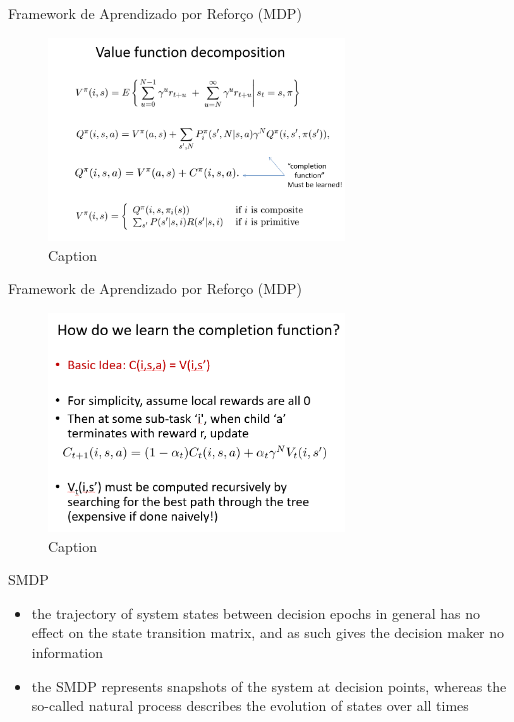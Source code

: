 \begin{frame}{Framework de Aprendizado por Reforço (MDP)}
    \begin{figure}
        \centering
        \includegraphics[width=0.7\textwidth]{img/valueFunctionDecomposition.png}
        \caption{Caption}
        \label{fig:my_label}
    \end{figure}
\end{frame}

\begin{frame}{Framework de Aprendizado por Reforço (MDP)}
    \begin{figure}
        \centering
        \includegraphics[width=0.7\textwidth]{img/completion_function.png}
        \caption{Caption}
        \label{fig:my_label}
    \end{figure}
\end{frame}

\begin{frame}{SMDP}
    \begin{itemize}
        \item the trajectory of system states between decision epochs in general has no effect on the state transition matrix, and as such gives the decision maker no information \cite{Mahadevan97selfImprovingFactory}
        \item the SMDP represents snapshots of the system at decision points, whereas the so-called natural process describes the evolution of states over all times \cite{Mahadevan97selfImprovingFactory}
    \end{itemize}
\end{frame}

